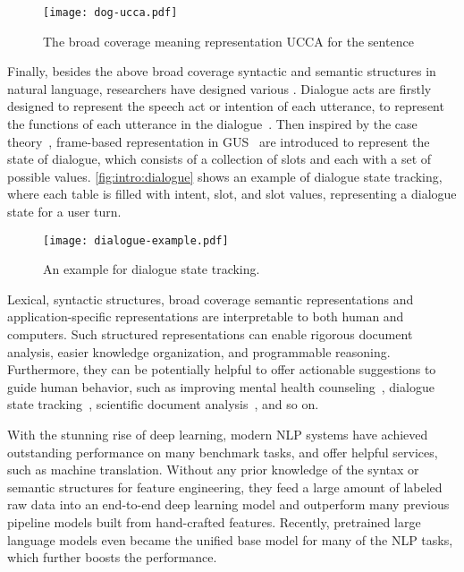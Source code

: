 \begin{figure}[!tbp]
\centering
\texttt{[image: dog-ucca.pdf]}
\caption{\label{fig:intro:dog-ucca} The broad coverage meaning
  representation UCCA for the sentence \emph{}}
\end{figure}

Finally, besides the above broad coverage syntactic and semantic
structures in natural language, researchers have designed various
. Dialogue acts are
firstly designed to represent the speech act or intention of each
utterance, to represent the functions of each utterance in the
dialogue~\citep{wittgenstein2010philosophical,bunt2010towards}. Then
inspired by the case theory~\citep{Fillmore:68}, frame-based
representation in GUS~\citep{bobrow1977gus} are introduced to
represent the state of dialogue, which consists of a collection of
slots and each with a set of possible
values. \autoref{fig:intro:dialogue} shows an example of dialogue
state tracking, where each table is filled with intent, slot, and slot
values, representing a dialogue state for a user turn.

\begin{figure}[!tbp]
\centering
\texttt{[image: dialogue-example.pdf]}
\caption{\label{fig:intro:dialogue} An example for dialogue state
  tracking.}
\end{figure}

Lexical, syntactic structures, broad coverage semantic representations
and application-specific representations are interpretable to both
human and computers. Such structured representations can enable
rigorous document analysis, easier knowledge organization, and
programmable reasoning. Furthermore, they can be potentially helpful
to offer actionable suggestions to guide human behavior, such as
improving mental health counseling~\citep{tanana2016comparison},
dialogue state tracking~\citep{budzianowski2018multiwoz}, scientific
document analysis~\citep{dernoncourt2017pubmed}, and so on.

With the stunning rise of deep learning, modern NLP systems have
achieved outstanding performance on many benchmark tasks, and offer
helpful services, such as machine translation. Without any prior
knowledge of the syntax or semantic structures for feature
engineering, they feed a large amount of labeled raw data
into an end-to-end deep learning model and outperform many previous
pipeline models built from hand-crafted features. Recently, pretrained
large language models even became the unified base model for many of
the NLP tasks, which further boosts the performance.

